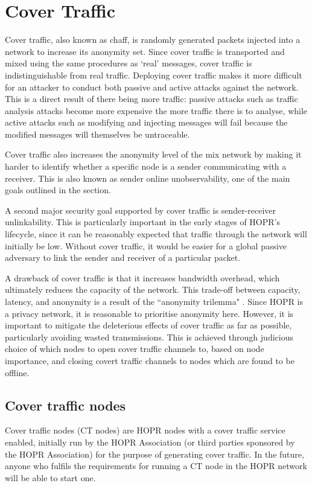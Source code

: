 \section{Cover Traffic}

Cover traffic, also known as chaff, is randomly generated packets injected into a network to increase its anonymity set. Since cover traffic is transported and mixed using the same procedures as `real' messages, cover traffic is indistinguishable from real traffic. Deploying cover traffic makes it more difficult for an attacker to conduct both passive and active attacks against the network. This is a direct result of there being more traffic: passive attacks such as traffic analysis attacks become more expensive the more traffic there is to analyse, while active attacks such as modifying and injecting messages will fail because the modified messages will themselves be untraceable.

Cover traffic also increases the anonymity level of the mix network by making it harder to identify whether a specific node is a sender communicating with a receiver. This is also known as sender online unobservability, one of the main goals outlined in the  section.

A second major security goal supported by cover traffic is sender-receiver unlinkability. This is particularly important in the early stages of HOPR's lifecycle, since it can be reasonably expected that traffic through the network will initially be low. Without cover traffic, it would be easier for a global passive adversary to link the sender and receiver of a particular packet.

A drawback of cover traffic is that it increases bandwidth overhead, which ultimately reduces the capacity of the network. This trade-off between capacity, latency, and anonymity is a result of the ``anonymity trilemma" \cite{AnonymityTrilemma}. Since HOPR is a privacy network, it is reasonable to prioritise anonymity here. However, it is important to mitigate the deleterious effects of cover traffic as far as possible, particularly avoiding wasted transmissions. This is achieved through judicious choice of which nodes to open cover traffic channels to, based on node importance, and closing covert traffic channels to nodes which are found to be offline. 

\subsection{Cover traffic nodes}
Cover traffic nodes (CT nodes) are HOPR nodes with a cover traffic service enabled, initially run by the HOPR Association (or third parties sponsored by the HOPR Association) for the purpose of generating cover traffic. In the future, anyone who fulfils the requirements for running a CT node in the HOPR network will be able to start one.

